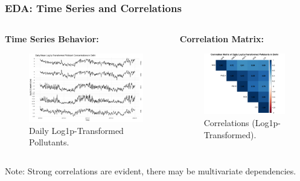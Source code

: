 \documentclass[svgnames, 12pt]{beamer}
\begin{document}
\begin{frame}
    \frametitle{EDA: Time Series and Correlations}
    \begin{columns}[T] %
        \begin{column}{0.5\textwidth}
            \textbf{Time Series Behavior:}
            \begin{figure}
                \includegraphics[width=\linewidth]{../analysis/assets/daily_ts_delhi.png}
                \caption*{Daily Log1p-Transformed Pollutants.}
            \end{figure}
        \end{column}
        \begin{column}{0.5\textwidth}
            \textbf{Correlation Matrix:}
            \begin{figure}
                \includegraphics[width=0.9\linewidth]{../analysis/assets/corrplot_delhi.png}
                \caption*{Correlations (Log1p-Transformed).}
            \end{figure}
        \end{column}
    \end{columns}
    \footnotesize Note: Strong correlations are evident, there may be multivariate dependencies.
\end{frame}
\end{document}
